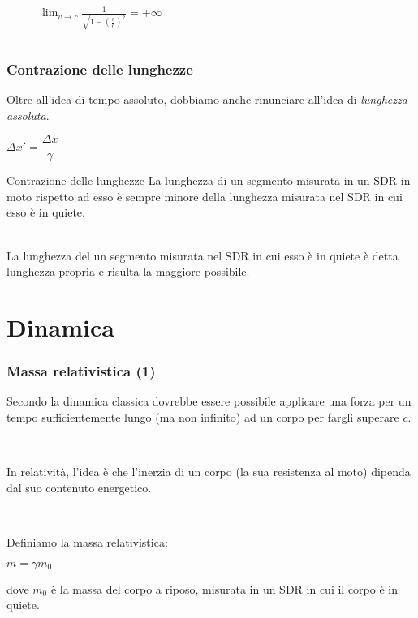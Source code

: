 \documentclass[]{beamer}
\theoremstyle{plain}
\begin{document}
\begin{frame}
\begin{columns}
\begin{column}{0.6\textwidth}
\begin{figure}
~

\footnotesize
$ \displaystyle \lim_{v \to c} \frac{1}{\sqrt{1- \left( \frac{v}{c} \right)^2 }} = + \infty  $


\end{figure}
\end{column}
\end{columns}
\end{frame}





\begin{frame}
  \frametitle{Contrazione delle lunghezze}
Oltre all'idea di tempo assoluto, dobbiamo anche rinunciare all'idea di \emph{lunghezza assoluta}.\pause
  \begin{center}
\colorbox{marroncino!30}{$ \Delta x' = \dfrac{\Delta x}{\gamma} $}
\end{center}\pause
\begin{block}{Contrazione delle lunghezze}
La lunghezza di un segmento misurata in un SDR in moto rispetto ad esso è sempre minore della lunghezza misurata nel SDR in cui esso è in quiete.
\end{block}~\pause\\    
La lunghezza del un segmento misurata nel SDR in cui esso è in quiete è detta \alert{lunghezza propria} e risulta la maggiore possibile.
\end{frame}





\section{Dinamica}

\begin{frame}
\frametitle{Massa relativistica (1)}
Secondo la dinamica classica dovrebbe essere possibile applicare una forza per un tempo sufficientemente lungo (ma non infinito) ad un corpo per fargli superare $ c $.\pause

~

In relatività, l'idea è che l'inerzia di un corpo (la sua resistenza al moto) dipenda dal suo contenuto energetico.\pause

~

Definiamo la \alert{massa relativistica}:
\begin{center}
\colorbox{marroncino!30}{$ m = \gamma m_0 $}
\end{center}
dove $ m_0 $ è la massa del corpo a riposo, misurata in un SDR in cui il corpo è in quiete.
\end{frame}
\end{document}
